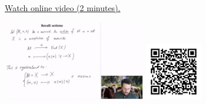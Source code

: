 
\begin{minipage}{10cm}
    \href{https://act4e-spring21.netlify.app/videos/spring2021-operads-b:actions-recap.html}{Watch online video (2 minutes).}
        
    \href{https://act4e-spring21.netlify.app/videos/spring2021-operads-b:actions-recap.html}{\includegraphics[height=3.5cm]{spring2021-operads-b:actions-recap/thumbnails.jpg}}
    \href{https://act4e-spring21.netlify.app/videos/spring2021-operads-b:actions-recap.html}{\includegraphics[height=2.5cm]{spring2021-operads-b:actions-recap/qrcode.png}}
\end{minipage}
